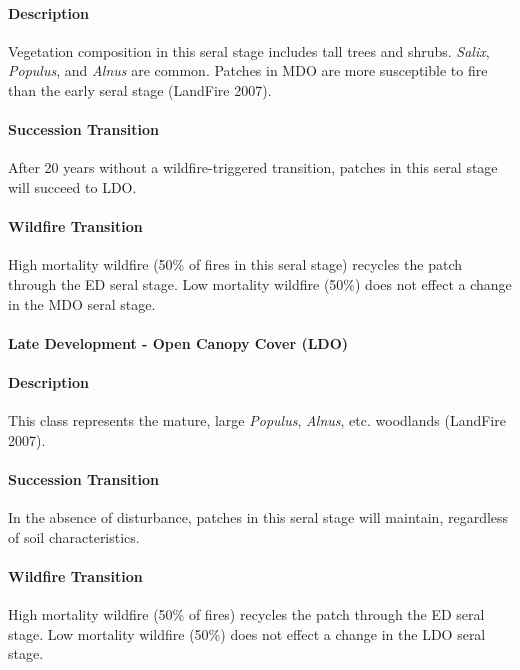 \paragraph{Description} Vegetation composition in this seral stage includes tall trees and shrubs. \emph{Salix}, \emph{Populus}, and \emph{Alnus} are common. Patches in MDO are more susceptible to fire than the early seral stage (LandFire 2007).

\paragraph{Succession Transition} After 20 years without a wildfire-triggered transition, patches in this seral stage will succeed to LDO.

\paragraph{Wildfire Transition} High mortality wildfire (50\% of fires in this seral stage) recycles the patch through the ED seral stage. Low mortality wildfire (50\%) does not effect a change in the MDO seral stage.

\noindent\hrulefill


\paragraph{Late Development - Open Canopy Cover (LDO)}

\paragraph{Description} This class represents the mature, large \emph{Populus}, \emph{Alnus}, etc. woodlands (LandFire 2007).

\paragraph{Succession Transition} In the absence of disturbance, patches in this seral stage will maintain, regardless of soil characteristics.

\paragraph{Wildfire Transition} High mortality wildfire (50\% of fires) recycles the patch through the ED seral stage. Low mortality wildfire (50\%) does not effect a change in the LDO seral stage.

\noindent\hrulefill





